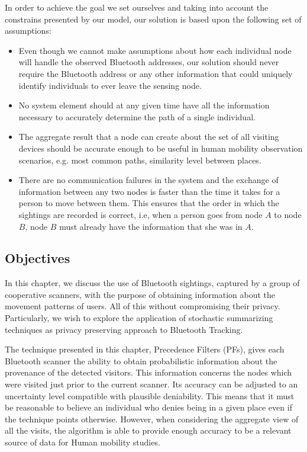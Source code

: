 In order to achieve the goal we set ourselves and taking into account
the constrains presented by our model, our solution is based upon the
following set of assumptions:
\begin{itemize}
\item Even though we cannot make assumptions about how each individual
  node will handle the observed Bluetooth addresses, our solution
  should never require the Bluetooth address or any other information
  that could uniquely identify individuals to ever leave the sensing
  node.
\item No system element should at any given time have all the
  information necessary to accurately determine the path of a single
  individual.
\item The aggregate result that a node can create about the set of all
  visiting devices should be accurate enough to be useful in human
  mobility observation scenarios, e.g. most common paths, similarity
  level between places.
\item There are no communication failures in the system and the
  exchange of information between any two nodes is faster than the
  time it takes for a person to move between them. This ensures that
  the order in which the sightings are recorded is correct, i.e, when
  a person goes from node $A$ to node $B$, node $B$ must already
  have the information that she was in $A$.
\end{itemize}

\subsection{Objectives}
\label{sec:ct-objectives}
In this chapter, we discuss the use of Bluetooth sightings, captured
by a group of cooperative scanners, with the purpose of obtaining
information about the movement patterns of users. All of this
without compromising their privacy. Particularly, we wish to explore
the application of stochastic summarizing techniques as privacy
preserving approach to Bluetooth Tracking.

The technique presented in this chapter, Precedence Filters (PFs), gives
each Bluetooth scanner the ability to obtain probabilistic information
about the provenance of the detected visitors. This information
concerns the nodes which were visited just prior to the current
scanner. Its accuracy can be adjusted to an uncertainty level
compatible with plausible deniability. This means that it must be
reasonable to believe an individual who denies being in a given place
even if the technique points
otherwise. %
However, when considering the aggregate view of all the visits, the
algorithm is able to provide enough accuracy to be a relevant source
of data for Human mobility studies.

